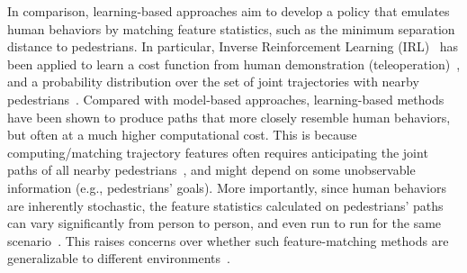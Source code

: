 In comparison, learning-based approaches aim to develop a policy that emulates human behaviors by matching feature statistics, such as the minimum separation distance to pedestrians. In particular, Inverse Reinforcement Learning (IRL)~\cite{abbeel_apprenticeship_2004} has been applied to learn a cost function from human demonstration (teleoperation)~\cite{kim_socially_2015}, and a probability distribution over the set of joint trajectories with nearby pedestrians~\cite{kuderer_feature-based_2012,kretzschmar_socially_2016}. Compared with model-based approaches, learning-based methods have been shown to produce paths that more closely resemble human behaviors, but often at a much higher computational cost. This is because computing/matching trajectory features often requires anticipating the joint paths of all nearby pedestrians~\cite{kretzschmar_socially_2016}, and might depend on some  unobservable information (e.g., pedestrians' goals). 
More importantly, since human behaviors are inherently stochastic, 
the feature statistics calculated on pedestrians' paths can vary significantly from person to person, and even run to run for the same scenario~\cite{kim_socially_2015,kretzschmar_socially_2016}. This raises concerns over whether such feature-matching methods are generalizable to different environments~\cite{mehta_autonomous_2016}.


